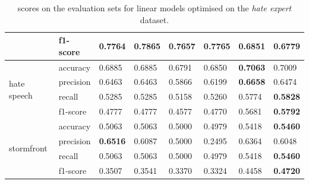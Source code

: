 \begin{table}[]
\begin{minipage}{0.42\paperheight}
{\begin{tabular}{ll|ll|ll|ll}
                                       & f1-score  & 0.7764      & \bf{0.7865}  & 0.7657      & 0.7765     & 0.6851      & 0.6779       \\ \hline
    \multirow{4}{*}{hate speech}       & accuracy  & 0.6885      & 0.6885       & 0.6791      & 0.6850     & \bf{0.7063} & 0.7009       \\
                                       & precision & 0.6463      & 0.6463       & 0.5866      & 0.6199     & \bf{0.6658} & 0.6474       \\
                                       & recall    & 0.5285      & 0.5285       & 0.5158      & 0.5260     & 0.5774      & \bf{0.5828}  \\
                                       & f1-score  & 0.4777      & 0.4777       & 0.4577      & 0.4770     & 0.5681      & \bf{0.5792}  \\ \hline
    \multirow{4}{*}{stormfront}        & accuracy  & 0.5063      & 0.5063       & 0.5000      & 0.4979     & 0.5418      & \bf{0.5460}  \\
                                       & precision & \bf{0.6516} & 0.6087       & 0.5000      & 0.2495     & 0.6364      & 0.6048       \\
                                       & recall    & 0.5063      & 0.5063       & 0.5000      & 0.4979     & 0.5418      & \bf{0.5460}  \\
                                       & f1-score  & 0.3507      & 0.3541       & 0.3370      & 0.3324     & 0.4458      & \bf{0.4720}
    \end{tabular}%
    }    
    \caption{scores on the evaluation sets for  linear models optimised on the \textit{hate expert} dataset.}
    \label{tab:linear_hateexp_baselines}
    \vfill
    

\end{minipage}
\end{table}

